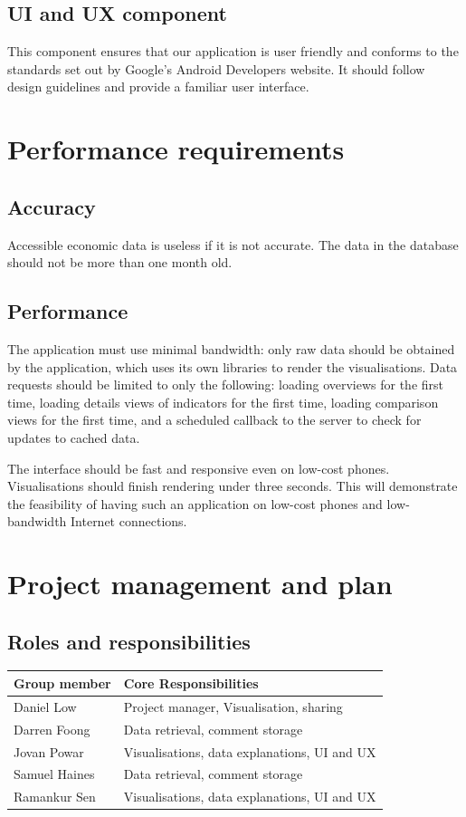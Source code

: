 \documentclass[12pt,a4paper,twoside]{article}
\begin{document}
\subsection{UI and UX component}
This component ensures that our application is user friendly and conforms to the standards set out by Google's Android Developers website. It should follow design guidelines and provide a familiar user interface.

\section{Performance requirements}

\subsection{Accuracy}
Accessible economic data is useless if it is not accurate. The data in the database should not be more than one month old.

\subsection{Performance}
The application must use minimal bandwidth: only raw data should be obtained by the application, which uses its own libraries to render the visualisations. Data requests should be limited to only the following: loading overviews for the first time, loading details views of indicators for the first time, loading comparison views for the first time, and a scheduled callback to the server to check for updates to cached data. 

The interface should be fast and responsive even on low-cost phones. Visualisations should finish rendering under three seconds. This will demonstrate the feasibility of having such an application on low-cost phones and low-bandwidth Internet connections.

\section{Project management and plan}

\subsection{Roles and responsibilities}
\setlength{\extrarowheight}{5pt}
\begin{tabular}{|m{5.5cm}|m{9.5cm}|}
\hline
\textbf{Group member} & \textbf{Core Responsibilities}\\
\hline
Daniel Low &  Project manager, Visualisation, sharing \\
\hline
Darren Foong & Data retrieval, comment storage \\
\hline
Jovan Powar & Visualisations, data explanations, UI and UX\\
\hline
Samuel Haines & Data retrieval, comment storage\\
\hline
Ramankur Sen & Visualisations, data explanations, UI and UX\\
\hline
\end{tabular}
\end{document}
